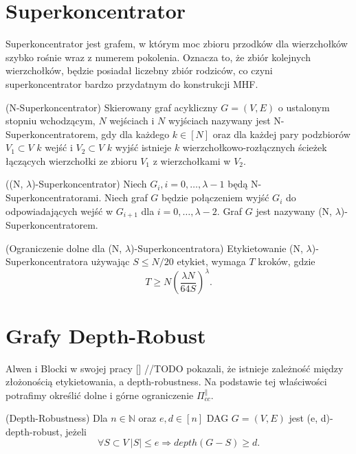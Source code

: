 \section{Superkoncentrator}
Superkoncentrator jest grafem, w którym moc zbioru przodków dla wierzchołków szybko rośnie wraz z numerem pokolenia. Oznacza to, że zbiór kolejnych wierzchołków, będzie posiadał liczebny zbiór rodziców, co czyni superkoncentrator bardzo przydatnym do konstrukcji MHF.
\begin{definition}
	(N-Superkoncentrator) Skierowany graf acykliczny $G = (V, E)$ o ustalonym stopniu wchodzącym, $N$ wejściach i
	$N$ wyjściach nazywany jest N-Superkoncentratorem, gdy dla każdego $k \in [N]$
	oraz dla każdej pary podzbiorów $V_{1} \subset V$ $k$ wejść i $V_{2} \subset V$ $k$ wyjść istnieje
	$k$ wierzchołkowo-rozłącznych ścieżek łączących wierzchołki ze zbioru $V_{1}$ z wierzchołkami w $V_{2}$.
\end{definition}

\begin{definition}
	((N, $\lambda$)-Superkoncentrator) Niech $G_{i}, i = 0, \dots, \lambda-1$ będą N-Superkoncentratorami.
	Niech graf $G$ będzie połączeniem wyjść $G_{i}$ do odpowiadających wejść w $G_{i+1}$ dla $i = 0, \dots, \lambda - 2$.
	Graf $G$ jest nazywany (N, $\lambda$)-Superkoncentratorem.
\end{definition}

\begin{theorem}
	(Ograniczenie dolne dla (N, $ \lambda $)-Superkoncentratora)
	Etykietowanie (N, $\lambda$)-Superkoncentratora używając $S \leq N/20$ etykiet, wymaga $T$ kroków, gdzie
	$$ T \geq N \left( \frac{ \lambda N}{64 S} \right) ^{ \lambda }.$$
\end{theorem}

\section{Grafy Depth-Robust}

Alwen i Blocki w swojej pracy [] //TODO
pokazali, że istnieje zależność między złożonością etykietowania, a depth-robustness. Na podstawie tej właściwości potrafimy określić dolne i górne ograniczenie $\Pi_{ cc }^{ \parallel }$.

\begin{definition}
	(Depth-Robustness) Dla $n \in \mathbb{N}$ oraz $e, d \in [n]$ DAG $G = (V, E)$
	jest (e, d)-depth-robust, jeżeli
	$$ \forall S \subset V \ | S | \leq e \Rightarrow depth(G - S) \geq d.$$
\end{definition}

